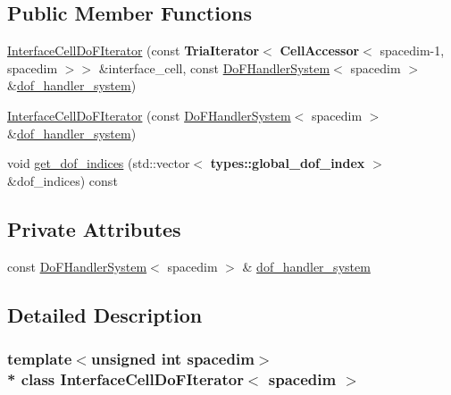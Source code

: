 \subsection*{Public Member Functions}
\begin{DoxyCompactItemize}
\item 
\hyperlink{class_interface_cell_do_f_iterator_a41a74a50c801c67a5393d568ed2768b7}{Interface\+Cell\+Do\+F\+Iterator} (const {\bf Tria\+Iterator}$<$ {\bf Cell\+Accessor}$<$ spacedim-\/1, spacedim $>$$>$ \&interface\+\_\+cell, const \hyperlink{class_do_f_handler_system}{Do\+F\+Handler\+System}$<$ spacedim $>$ \&\hyperlink{class_interface_cell_do_f_iterator_a62045b61faee901392a7326b624d2b02}{dof\+\_\+handler\+\_\+system})
\item 
\hyperlink{class_interface_cell_do_f_iterator_a0dc67a5bf4cbf83e786af1fb28b6dd7c}{Interface\+Cell\+Do\+F\+Iterator} (const \hyperlink{class_do_f_handler_system}{Do\+F\+Handler\+System}$<$ spacedim $>$ \&\hyperlink{class_interface_cell_do_f_iterator_a62045b61faee901392a7326b624d2b02}{dof\+\_\+handler\+\_\+system})
\item 
void \hyperlink{class_interface_cell_do_f_iterator_a7cd69c855243c0d8fb5df97911411edd}{get\+\_\+dof\+\_\+indices} (std\+::vector$<$ {\bf types\+::global\+\_\+dof\+\_\+index} $>$ \&dof\+\_\+indices) const 
\end{DoxyCompactItemize}
\subsection*{Private Attributes}
\begin{DoxyCompactItemize}
\item 
const \hyperlink{class_do_f_handler_system}{Do\+F\+Handler\+System}$<$ spacedim $>$ \& \hyperlink{class_interface_cell_do_f_iterator_a62045b61faee901392a7326b624d2b02}{dof\+\_\+handler\+\_\+system}
\end{DoxyCompactItemize}


\subsection{Detailed Description}
\subsubsection*{template$<$unsigned int spacedim$>$\\*
class Interface\+Cell\+Do\+F\+Iterator$<$ spacedim $>$}

